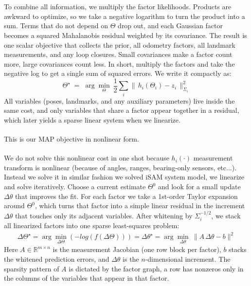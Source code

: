 \\ \\
To combine all information, we multiply the factor likelihoods. Products are awkward to optimize, so we take a negative logarithm to turn the product into a sum. Terms that do not depend on $\Theta$ drop out, and each Gaussian factor becomes a squared Mahalanobis residual weighted by its covariance. The result is one scalar objective that collects the prior, all odometry factors, all landmark measurements, and any loop closures. Small covariances make a factor count more, large covariances count less. In short, multiply the factors and take the negative log to get a single sum of squared errors. We write it compactly as:
\[
    \Theta^\star \;=\;\arg\min_{\Theta}\ \frac12\sum_i \|\,h_i(\Theta_i)-z_i\,\|^2_{\Sigma_i}
\]
All variables (poses, landmarks, and any auxiliary parameters) live inside the same cost, and only variables that share a factor appear together in a residual, which later yields a sparse linear system when we linearize.
\\ \\
This is our MAP objective in nonlinear form.
\\ \\
We do not solve this nonlinear cost in one shot because $h_i(\cdot)$ measurement transform is nonlinear (because of angles, ranges, bearing-only sensors, etc...). Instead we solve it in similar fashion we solved iSAM system model, we linearize and solve iteratively. Choose a current estimate $\Theta^0$ and look for a small update $\Delta\theta$ that improves the fit. For each factor we take a 1st-order Taylor expansion around $\Theta^0$, which turns that factor into a simple linear residual in the increment $\Delta\theta$ that touches only its adjacent variables. After whitening by $\Sigma_i^{-1/2}$, we stack all linearized factors into one sparse least-squares problem:
\begin{equation}
    \begin{aligned}
        \Delta\Theta^\star = \arg\min_{\Delta\Theta} \left( -log\left(f(\Delta\Theta)\right) \right) = \Delta\theta^\star = \arg\min_{\Delta\theta}\ \|A\,\Delta\theta - b\|^2
    \end{aligned}
    \label{eq:optimizer-iSAM2-least-square}
\end{equation}
Here $A\in\mathbb{R}^{m\times n}$ is the measurement Jacobian (one row block per factor), $b$ stacks the whitened prediction errors, and $\Delta\theta$ is the $n$-dimensional increment. The sparsity pattern of $A$ is dictated by the factor graph, a row has nonzeros only in the columns of the variables that appear in that factor.
